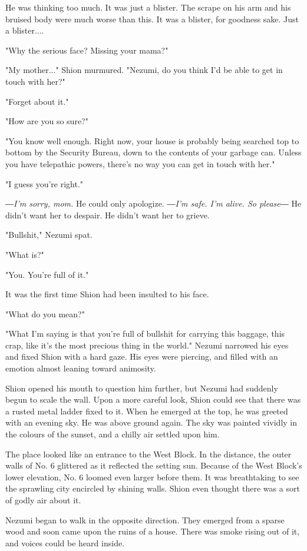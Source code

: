 He was thinking too much. It was just a blister. The scrape on his arm
and his bruised body were much worse than this. It was a blister, for
goodness sake. Just a blister....

"Why the serious face? Missing your mama?"

"My mother..." Shion murmured. "Nezumi, do you think I'd be able to get
in touch with her?"

"Forget about it."

"How are you so sure?"

"You know well enough. Right now, your house is probably being searched
top to bottom by the Security Bureau, down to the contents of your
garbage can. Unless you have telepathic powers, there's no way you can
get in touch with her."

"I guess you're right."

\emph{―I'm sorry, mom.} He could only apologize. \emph{―I'm safe. I'm alive. So
	please―} He didn't want her to despair. He didn't want her to grieve.

"Bullshit," Nezumi spat.

"What is?"

"You. You're full of it."

It was the first time Shion had been insulted to his face.

"What do you mean?"

"What I'm saying is that you're full of bullshit for carrying this
baggage, this crap, like it's the most precious thing in the world."
Nezumi narrowed his eyes and fixed Shion with a hard gaze. His eyes were
piercing, and filled with an emotion almost leaning toward animosity.

Shion opened his mouth to question him further, but Nezumi had suddenly
begun to scale the wall. Upon a more careful look, Shion could see that
there was a rusted metal ladder fixed to it. When he emerged at the top,
he was greeted with an evening sky. He was above ground again. The sky
was painted vividly in the colours of the sunset, and a chilly air
settled upon him.

The place looked like an entrance to the West Block. In the distance,
the outer walls of No. 6 glittered as it reflected the setting sun.
Because of the West Block's lower elevation, No. 6 loomed even larger
before them. It was breathtaking to see the sprawling city encircled by
shining walls. Shion even thought there was a sort of godly air about
it.

Nezumi began to walk in the opposite direction. They emerged from a
sparse wood and soon came upon the ruins of a house. There was smoke
rising out of it, and voices could be heard inside.

